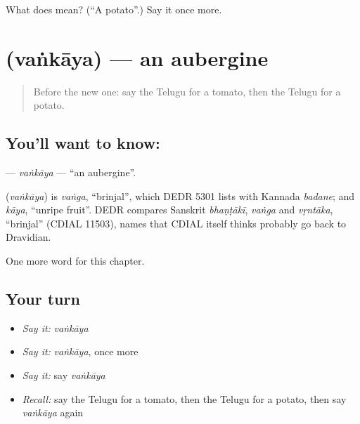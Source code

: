 \begin{tcolorbox}[breakable,colback=teal!4,colframe=teal!35!black,title={Before you move on}]
What does  mean? (\textquotedblleft{}A potato\textquotedblright{}.) Say it once more.
\end{tcolorbox}
\section[\texorpdfstring{\te{వంకాయ} (vaṅkāya)}{వంకాయ (vaṅkāya)}]{ (vaṅkāya) — an aubergine}

\label{lesson:TE-C118-vankaya}



\begin{quote}
Before the new one: say the Telugu for a tomato, then the Telugu for a potato.
\end{quote}

\subsection*{You'll want to know: }
\textbf{} — \emph{vaṅkāya} — \textquotedblleft{}an aubergine\textquotedblright{}.

\begin{cousinweb}
\textbf{} (\emph{vaṅkāya}) is \emph{vaṅga}, \textquotedblleft{}brinjal\textquotedblright{}, which DEDR 5301 lists with Kannada \emph{badane}; and \emph{kāya}, \textquotedblleft{}unripe fruit\textquotedblright{}. DEDR compares Sanskrit \emph{bhaṇṭākī}, \emph{vaṅga} and \emph{vṛntāka}, \textquotedblleft{}brinjal\textquotedblright{} (CDIAL 11503), names that CDIAL itself thinks probably go back to Dravidian.
\end{cousinweb}

\begin{grammarlens}[title={What you've built}]
One more word for this chapter.
\end{grammarlens}

\subsection*{Your turn}
\begin{itemize}
\raggedright
  \item \emph{Say it:} \emph{vaṅkāya}
  \item \emph{Say it:} \emph{vaṅkāya}, once more
  \item \emph{Say it:} say \emph{vaṅkāya}
  \item \emph{Recall:} say the Telugu for a tomato, then the Telugu for a potato, then say \emph{vaṅkāya} again
\end{itemize}

